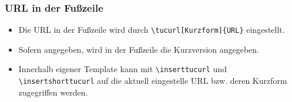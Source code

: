 \begin{frame}[containsverbatim]
\frametitle{URL in der Fußzeile}

\begin{itemize}
\item Die URL in der Fußzeile wird durch
      \lstinline[language={[LaTeX]{TeX}}]+\tucurl[Kurzform]{URL}+
      eingestellt.
\item Sofern angegeben, wird in der Fußzeile die Kurzversion angegeben.

\bigskip

\item Innerhalb eigener Template kann mit
      \lstinline[language={[LaTeX]{TeX}}]+\inserttucurl+ und
      \lstinline[language={[LaTeX]{TeX}}]+\insertshorttucurl+ auf die aktuell
      eingestelle URL bzw. deren Kurzform zugegriffen werden.
\end{itemize}
\end{frame}
